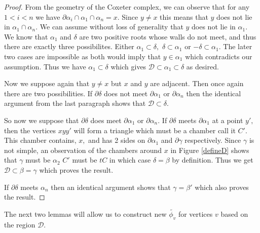 \documentclass[class=book, crop=false,12 pt]{standalone}
\begin{document}
\begin{proof}
From the geometry of the Coxeter complex, we can observe that for any $1<i<n$ we have $\partial \alpha_i \cap \alpha_1\cap \alpha_n=x.$ Since $y\neq x$ this means that $y$ does not lie in $\alpha_1\cap \alpha_n.$ We can assume without loss of generality that $y$ does not lie in $\alpha_1.$ We know that $\alpha_1$ and $\delta$ are two positive roots whose walls do not meet, and thus there are exactly three possibilites. Either $\alpha_1\subset \delta,$ $\delta\subset\alpha_1$ or $-\delta\subset \alpha_1.$ The later two cases are impossible as both would imply that $y\in \alpha_1$ which contradicts our assumption. Thus we have $\alpha_1\subset\delta$ which gives $\mathcal{D}\subset\alpha_1\subset \delta$ as desired.

Now we suppose again that $y\neq x$ but $x$ and $y$ are adjacent. Then once again there are two possibilities. If $\partial \delta$ does not meet $\partial \alpha_1$ or $\partial \alpha_n$ then the identical argument from the last paragraph shows that $\mathcal{D}\subset \delta.$

So now we suppose that $\partial \delta$ does meet $\partial \alpha_1$ or $\partial \alpha_n.$ If $\partial \delta$ meets $\partial \alpha_1$ at a point $y',$ then the vertices $xyy'$ will form a triangle which must be a chamber call it $C'.$ This chamber contains, $x,$ and has 2 sides on $\partial \alpha_1$ and $\partial \gamma$ respectively. Since $\gamma$ is not simple, an observation of the chambers around $x$ in Figure \ref{defineD} shows that $\gamma$ must be $\alpha_2$ $C'$ must be $tC$ in which case $\delta=\beta$ by definition. Thus we get $\mathcal{D}\subset \beta =\gamma$ which proves the result.

If $\partial \delta$ meets $\alpha_n$ then an identical argument shows that $\gamma=\beta'$ which also proves the result.

\end{proof}

The next two lemmas will allow us to construct new $\tilde{\phi_v}$ for vertices $v$ based on the region $\mathcal{D}.$
\end{document}
